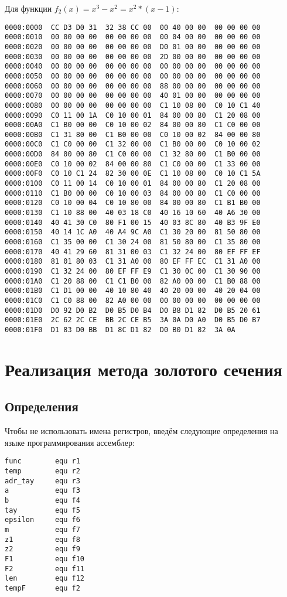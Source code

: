 \documentclass[12pt,a4paper,oneside]{report}
\begin{document}
Для функции $f_2(x)=x^3-x^2=x^2*(x-1)$:
\begin{verbatim}
0000:0000  CC D3 D0 31  32 38 CC 00  00 40 00 00  00 00 00 00
0000:0010  00 00 00 00  00 00 00 00  00 04 00 00  00 00 00 00
0000:0020  00 00 00 00  00 00 00 00  D0 01 00 00  00 00 00 00
0000:0030  00 00 00 00  00 00 00 00  2D 00 00 00  00 00 00 00
0000:0040  00 00 00 00  00 00 00 00  00 00 00 00  00 00 00 00
0000:0050  00 00 00 00  00 00 00 00  00 00 00 00  00 00 00 00
0000:0060  00 00 00 00  00 00 00 00  88 00 00 00  00 00 00 00
0000:0070  00 00 00 00  00 00 00 00  40 01 00 00  00 00 00 00
0000:0080  00 00 00 00  00 00 00 00  C1 10 08 00  C0 10 C1 40
0000:0090  C0 11 00 1A  C0 10 00 01  84 00 00 80  C1 20 08 00
0000:00A0  C1 B0 00 00  C0 10 00 02  84 00 00 80  C1 C0 00 00
0000:00B0  C1 31 80 00  C1 B0 00 00  C0 10 00 02  84 00 00 80
0000:00C0  C1 C0 00 00  C1 32 00 00  C1 B0 00 00  C0 10 00 02
0000:00D0  84 00 00 80  C1 C0 00 00  C1 32 80 00  C1 B0 00 00
0000:00E0  C0 10 00 02  84 00 00 80  C1 C0 00 00  C1 33 00 00
0000:00F0  C0 10 C1 24  82 30 00 0E  C1 10 08 00  C0 10 C1 5A
0000:0100  C0 11 00 14  C0 10 00 01  84 00 00 80  C1 20 08 00
0000:0110  C1 B0 00 00  C0 10 00 03  84 00 00 80  C1 C0 00 00
0000:0120  C0 10 00 04  C0 10 80 00  84 00 00 80  C1 B1 B0 00
0000:0130  C1 10 88 00  40 03 18 C0  40 16 10 60  40 A6 30 00
0000:0140  40 41 30 C0  80 F1 00 15  40 03 8C 80  40 B3 9F E0
0000:0150  40 14 1C A0  40 A4 9C A0  C1 30 20 00  81 50 80 00
0000:0160  C1 35 00 00  C1 30 24 00  81 50 80 00  C1 35 80 00
0000:0170  40 41 29 60  81 31 00 03  C1 32 24 00  80 EF FF EF
0000:0180  81 01 80 03  C1 31 A0 00  80 EF FF EC  C1 31 A0 00
0000:0190  C1 32 24 00  80 EF FF E9  C1 30 0C 00  C1 30 90 00
0000:01A0  C1 20 88 00  C1 C1 B0 00  82 A0 00 00  C1 B0 88 00
0000:01B0  C1 D1 00 00  40 10 80 40  40 20 00 00  40 20 04 00
0000:01C0  C1 C0 88 00  82 A0 00 00  00 00 00 00  00 00 00 00
0000:01D0  D0 92 D0 B2  D0 B5 D0 B4  D0 B8 D1 82  D0 B5 20 61
0000:01E0  2C 62 2C CE  BB 2C CE B5  3A 0A D0 A0  D0 B5 D0 B7
0000:01F0  D1 83 D0 BB  D1 8C D1 82  D0 B0 D1 82  3A 0A
\end{verbatim}

\chapter{Реализация метода золотого \-сечения}
\section{Определения}
Чтобы не использовать имена регистров, введём следующие определения на языке программирования ассемблер:
\begin{verbatim}
func        equ r1
temp        equ r2
adr_tay     equ r3
a           equ f3
b           equ f4
tay         equ f5
epsilon     equ f6
m           equ f7
z1          equ f8
z2          equ f9
F1          equ f10
F2          equ f11
len         equ f12
tempF       equ f2
\end{verbatim}
\end{document}
